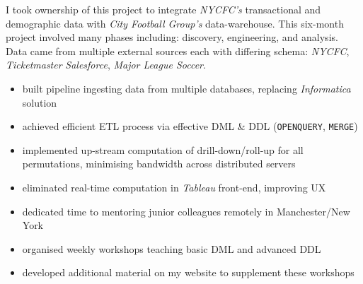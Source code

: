 \documentclass[letterpaper,11pt]{article}
\begin{document}
\begin{description}[style=multiline,leftmargin=3cm]
	\item[New York City FC Project]
	      I took ownership of this project to integrate \textit{NYCFC's} transactional and demographic data with \textit{City Football Group's} data-warehouse. This six-month project involved many phases including: discovery, engineering, and analysis. Data came from multiple external sources each with differing schema: \textit{NYCFC}, \textit{Ticketmaster} \textit{Salesforce}, \textit{Major League Soccer}.

	      \begin{description}[style=multiline,leftmargin=2.5cm]
		      \item[Data Pipeline]
		            {
		            \begin{itemize}
			            \item built pipeline ingesting data from multiple databases, replacing \textit{Informatica} solution
			            \item achieved efficient ETL process via effective DML \& DDL (\texttt{OPENQUERY}, \texttt{MERGE})
		            \end{itemize}
		            }
		      \item[Data Cubes]
		            {
		            \begin{itemize}
			            \item implemented up-stream computation of drill-down/roll-up for all permutations, minimising bandwidth across distributed servers
			            \item eliminated real-time computation in \textit{Tableau} front-end, improving UX
		            \end{itemize}
		            }
		      \item[Mentoring]
		            {
		            \begin{itemize}
			            \item dedicated time to mentoring junior colleagues remotely in Manchester/New York
			            \item organised weekly workshops teaching basic DML and advanced DDL
			            \item developed additional material on my website to supplement these workshops
		            \end{itemize}
		            }
	      \end{description}
	\item[GDPR Pipeline]
	      \begin{itemize}

\end{itemize}
\end{description}
\end{document}
